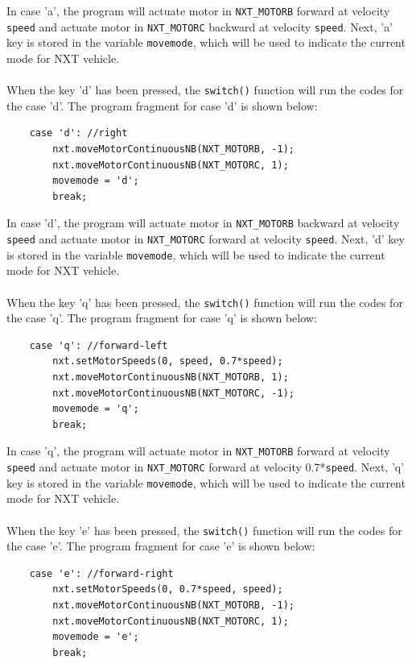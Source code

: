 In case 'a', the program will actuate motor in \verb+NXT_MOTORB+ forward at velocity \verb+speed+ 
and actuate motor in \verb+NXT_MOTORC+ backward at velocity \verb+speed+. Next, 'a' key is stored in the variable \verb+movemode+, which will be used to 
indicate the current mode for NXT vehicle.
\\ \\
\noindent
When the key 'd' has been pressed, the \verb+switch()+ function will run the codes for the case 'd'.
The program fragment for case 'd' is shown below:
\begin{verbatim} 
    case 'd': //right
        nxt.moveMotorContinuousNB(NXT_MOTORB, -1);
        nxt.moveMotorContinuousNB(NXT_MOTORC, 1);
        movemode = 'd';
        break;
\end{verbatim}
In case 'd', the program will actuate motor in \verb+NXT_MOTORB+ backward at velocity \verb+speed+ 
and actuate motor in \verb+NXT_MOTORC+ forward at velocity \verb+speed+. Next, 'd' key is stored in
the variable \verb+movemode+, which will be used to indicate the current mode for NXT vehicle.
\\ \\
\noindent
When the key 'q' has been pressed, the \verb+switch()+ function will run the codes for the case 'q'.
The program fragment for case 'q' is shown below:
\begin{verbatim} 
    case 'q': //forward-left
        nxt.setMotorSpeeds(0, speed, 0.7*speed);
        nxt.moveMotorContinuousNB(NXT_MOTORB, 1);
        nxt.moveMotorContinuousNB(NXT_MOTORC, -1);
        movemode = 'q';
        break;
\end{verbatim}
In case 'q', the program will actuate motor in \verb+NXT_MOTORB+ forward at velocity \verb+speed+ 
and actuate motor in \verb+NXT_MOTORC+ forward at velocity 0.7*\verb+speed+. Next, 'q' key is 
stored in the variable \verb+movemode+, which will be used to indicate the current mode for NXT 
vehicle.
\\ \\
\noindent 
When the key 'e' has been pressed, the \verb+switch()+ function will run the codes for the case 'e'.
The program fragment for case 'e' is shown below:
\begin{verbatim} 
    case 'e': //forward-right
        nxt.setMotorSpeeds(0, 0.7*speed, speed);
        nxt.moveMotorContinuousNB(NXT_MOTORB, -1);
        nxt.moveMotorContinuousNB(NXT_MOTORC, 1);
        movemode = 'e';
        break;
\end{verbatim}
